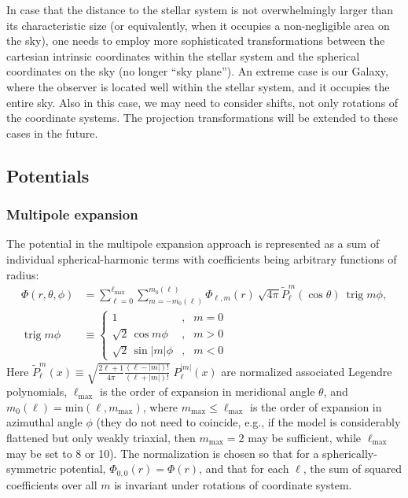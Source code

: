 \documentclass[12pt]{article}
\DeclareMathOperator{\trig}{trig}
\begin{document}
In case that the distance to the stellar system is not overwhelmingly larger than its characteristic size (or equivalently, when it occupies a non-negligible area on the sky), one needs to employ more sophisticated transformations between the cartesian intrinsic coordinates within the stellar system and the spherical coordinates on the sky (no longer ``sky plane''). An extreme case is our Galaxy, where the observer is located well within the stellar system, and it occupies the entire sky. Also in this case, we may need to consider shifts, not only rotations of the coordinate systems. The projection transformations will be extended to these cases in the future.


\subsection{Potentials}  \label{sec:PotentialDetails}


\subsubsection{Multipole expansion}  \label{sec:PotentialMultipoleDetails}

The potential in the multipole expansion approach is represented as a sum of individual spherical-harmonic terms with coefficients being arbitrary functions of radius:
\begin{align}
\Phi(r,\theta,\phi) &= \sum_{\ell=0}^{\ell_\mathrm{max}}\sum_{m=-m_0(\ell)}^{m_0(\ell)}
\Phi_{\ell,m}(r)\: \sqrt{4\pi} \tilde P_\ell^m(\cos\theta)\:\trig m\phi, \\
\trig m\phi &\equiv \left\{\begin{array}{rcl} 
  1 &,& m=0 \\
  \sqrt{2}\,\cos  m \phi &,& m > 0 \\
  \sqrt{2}\,\sin |m|\phi &,& m < 0 
\end{array}\right.   \nonumber
\end{align}
Here $\tilde P_\ell^m(x) \equiv \sqrt{\frac{2\ell+1}{4\pi}\frac{(\ell-|m|)!}{(\ell+|m|)!}} \;P_\ell^{|m|}(x)$ 
are normalized associated Legendre polynomials, $\ell_\mathrm{max}$ is the order of expansion in meridional angle $\theta$, and $m_0(\ell) = \mathrm{min}(\ell, m_\mathrm{max})$, where $m_\mathrm{max} \le \ell_\mathrm{max}$ is the order of expansion in azimuthal angle $\phi$ (they do not need to coincide, e.g., if the model is considerably flattened but only weakly triaxial, then $m_\mathrm{max}=2$ may be sufficient, while $\ell_\mathrm{max}$ may be set to 8 or 10). The normalization is chosen so that for a spherically-symmetric potential, $\Phi_{0,0}(r)=\Phi(r)$, and that for each $\ell$, the sum of squared coefficients over all $m$ is invariant under rotations of coordinate system.
\end{document}
